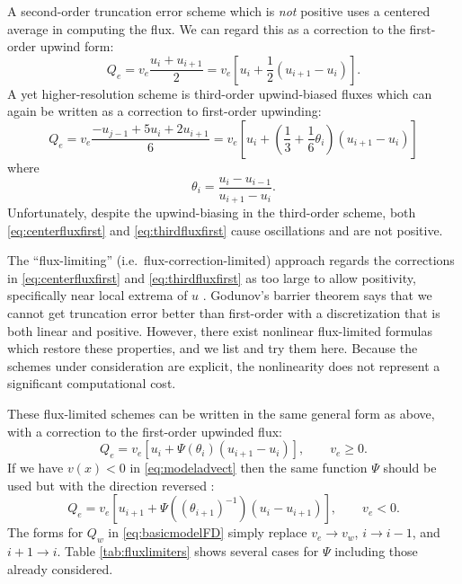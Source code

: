 \documentclass[11pt,final]{amsart}
\begin{document}
A second-order truncation error scheme which is \emph{not} positive uses a centered average in computing the flux.  We can regard this as a correction to the first-order upwind form:
\begin{equation}
Q_e = v_e \frac{u_i+u_{i+1}}{2} = v_e \left[u_i + \frac{1}{2} (u_{i+1} - u_i)\right]. \label{eq:centerfluxfirst}
\end{equation}
A yet higher-resolution scheme is third-order upwind-biased fluxes which can again be written as a correction to first-order upwinding:
\begin{equation}
Q_e = v_e \frac{-u_{j-1} + 5 u_i + 2 u_{i+1}}{6} = v_e \left[u_i + \left(\frac{1}{3}+\frac{1}{6} \theta_i \right) (u_{i+1} - u_i)\right] \label{eq:thirdfluxfirst}
\end{equation}
where
\begin{equation}
\theta_i = \frac{u_{i} - u_{i-1}}{u_{i+1} - u_i}.  \label{eq:thetadefine}
\end{equation}
Unfortunately, despite the upwind-biasing in the third-order scheme, both \eqref{eq:centerfluxfirst} and \eqref{eq:thirdfluxfirst} cause oscillations and are not positive.

The ``flux-limiting'' (i.e.~flux-correction-limited) approach regards the corrections in \eqref{eq:centerfluxfirst} and \eqref{eq:thirdfluxfirst} as too large to allow positivity, specifically near local extrema of $u$ \citep[section III.1.1]{HundsdorferVerwer2010}.  Godunov's barrier theorem \citep[section I.7.1]{HundsdorferVerwer2010} says that we cannot get truncation error better than first-order with a discretization that is both linear and positive.  However, there exist nonlinear flux-limited formulas which restore these properties, and we list and try them here.  Because the schemes under consideration are explicit, the nonlinearity does not represent a significant computational cost.

These flux-limited schemes can be written in the same general form as above, with a correction to the first-order upwinded flux:
\begin{equation}
Q_e = v_e \left[u_i + \Psi(\theta_i) (u_{i+1} - u_i)\right], \qquad v_e \ge 0. \label{eq:fluxlimiterform}
\end{equation}
If we have $v(x)<0$ in \eqref{eq:modeladvect} then the same function $\Psi$ should be used but with the direction reversed \citep[section III.1.1]{HundsdorferVerwer2010}:
\begin{equation}
Q_e = v_e \left[u_{i+1} + \Psi\left((\theta_{i+1})^{-1}\right) (u_i - u_{i+1})\right], \qquad v_e < 0. \label{eq:fluxlimiterformreversed}
\end{equation}
The forms for $Q_w$ in \eqref{eq:basicmodelFD} simply replace $v_e \to v_w$, $i\to i-1$, and $i+1\to i$.  Table \ref{tab:fluxlimiters} shows several cases for $\Psi$ including those already considered.
\end{document}
